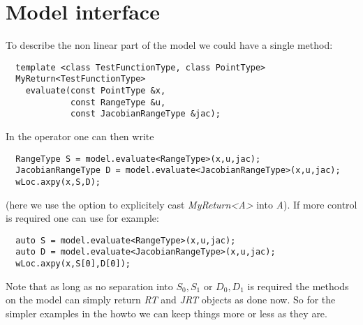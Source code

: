 \documentclass{article}
\begin{document}
\section{Model interface}

To describe the non linear part of the model we could have a single method:
\begin{lstlisting}
  template <class TestFunctionType, class PointType> 
  MyReturn<TestFunctionType> 
    evaluate(const PointType &x, 
             const RangeType &u,
             const JacobianRangeType &jac);
\end{lstlisting}
In the operator one can then write
\begin{lstlisting}
  RangeType S = model.evaluate<RangeType>(x,u,jac);
  JacobianRangeType D = model.evaluate<JacobianRangeType>(x,u,jac);
  wLoc.axpy(x,S,D);
\end{lstlisting}
(here we use the option to explicitely cast \emph{MyReturn<A>} into
\emph{A}).
If more control is required one can use for example:
\begin{lstlisting}
  auto S = model.evaluate<RangeType>(x,u,jac);
  auto D = model.evaluate<JacobianRangeType>(x,u,jac);
  wLoc.axpy(x,S[0],D[0]);
\end{lstlisting}
Note that as long as no separation into $S_0,S_1$ or $D_0,D_1$ is required
the methods on the model can simply return \emph{RT} and \emph{JRT} objects
as done now. So for the simpler examples in the howto we can keep things
more or less as they are. 
\end{document}
